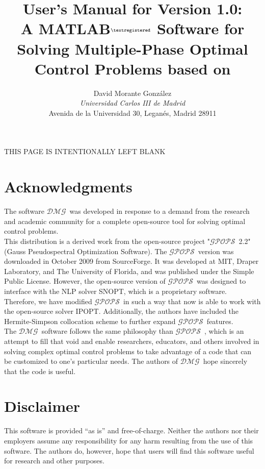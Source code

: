 \documentclass[10pt,final]{report}
\title{{\bf User's Manual for \dmg Version 1.0:} \vspace{12pt} \\
  {\bf A MATLAB$^{\textregistered}$ Software for Solving Multiple-Phase Optimal Control Problems based on \gpops}}
\author{David Morante Gonz\'alez\\ {\em Universidad Carlos III de Madrid} \\ Avenida de la Universidad 30, Legan\'es, Madrid 28911 }
\date{}
\newcommand{\dmg}{$\mathcal{DMG}$~}
\newcommand{\gpops}{$\mathcal{GPOPS}$~}
\begin{document}
\setcounter{tocdepth}{1}



\maketitle
\clearpage

\thispagestyle{empty}
\vspace*{6.75in}
\begin{center}
  THIS PAGE IS INTENTIONALLY LEFT BLANK
\end{center}

\chapter*{Acknowledgments}

The software \dmg was developed in response to a demand from
the research and academic community for a complete open-source tool
for solving optimal control problems.\\

This distribution is a derived work from the open-source project "\gpops 2.2" (Gauss Pseudospectral Optimization Software). The \gpops version was downloaded in October 2009 from SourceForge. It was developed at MIT, Draper Laboratory, and The University of Florida, and was published under the Simple Public License. However, the open-source version of \gpops was designed to interface with the NLP solver SNOPT, which is a proprietary software. Therefore, we have modified \gpops in such a way that now is able to work with the open-source solver IPOPT. Additionally, the authors have included the Hermite-Simpson collocation scheme to further expand \gpops features.\\


The \dmg software follows the same philosophy than \gpops, which is an
attempt to fill that void and enable researchers, educators, and
others involved in solving complex optimal control problems to take
advantage of a code that can be customized to one's particular needs.
The authors of \dmg hope sincerely that the code is useful.

\chapter*{Disclaimer}

This software is provided ``as is'' and free-of-charge.  Neither the
authors nor their employers assume any responsibility for any harm
resulting from the use of this software.  The authors do, however,
hope that users will find this software useful for research and other
purposes.
\end{document}
